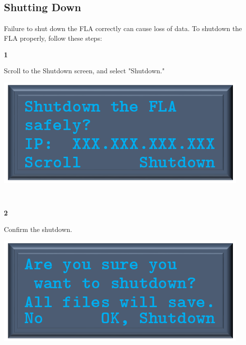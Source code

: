 \documentclass[11pt, oneside]{book}
\begin{document}
\subsection{Shutting Down}
\paragraph{  }
Failure to shut down the FLA correctly can cause loss of data. To shutdown the FLA properly, follow these steps:
\\[\baselineskip]
\noindent\begin{minipage}{0.45\textwidth}%
	\begin{center}
		\textbf{1}
	\end{center}
	Scroll to the Shutdown screen, and select "Shutdown."
\end{minipage}%
\hfill%
\begin{minipage}{0.45\textwidth} 
	\includegraphics[width=\linewidth]{../media/pstricks_files/02_shutdown_menu}
\end{minipage}\\[\baselineskip]
\noindent\begin{minipage}{0.45\textwidth}%
	\begin{center}
		\textbf{2}
	\end{center}
	Confirm the shutdown.
\end{minipage}%
\hfill%
\begin{minipage}{0.45\textwidth} 
	\includegraphics[width=\linewidth]{../media/pstricks_files/02_shutdown_confirm}
\end{minipage}\\[\baselineskip]
\end{document}

